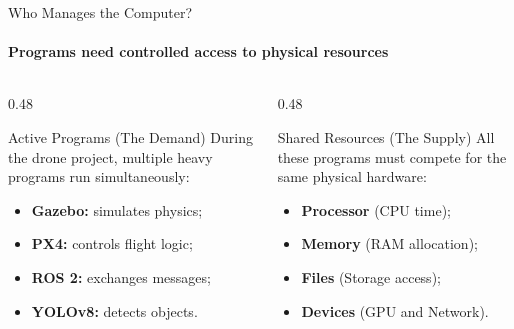 
\begin{frame}{Who Manages the Computer?}
\framesubtitle{Programs need controlled access to physical resources}

\footnotesize

\begin{columns}[T]
    
    \begin{column}{0.48\textwidth}
        \begin{block}{Active Programs (The Demand)}
            During the drone project, multiple heavy programs run simultaneously:
            \begin{itemize}
                \setlength{\itemsep}{0.25em}
                \item \textbf{Gazebo:} simulates physics;
                \item \textbf{PX4:} controls flight logic;
                \item \textbf{ROS 2:} exchanges messages;
                \item \textbf{YOLOv8:} detects objects.
            \end{itemize}
        \end{block}
    \end{column}

    \begin{column}{0.48\textwidth}
        \pause
        \begin{exampleblock}{Shared Resources (The Supply)}
            All these programs must compete for the same physical hardware:
            \begin{itemize}
                \setlength{\itemsep}{0.25em}
                \item \textbf{Processor} (CPU time);
                \item \textbf{Memory} (RAM allocation);
                \item \textbf{Files} (Storage access);
                \item \textbf{Devices} (GPU and Network).
            \end{itemize}
        \end{exampleblock}
    \end{column}


\end{columns}
\end{frame}
